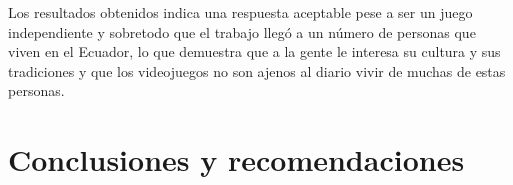 \documentclass[a4paper, openright, 12pt]{report}
\begin{document}
\justify


\justify
Los resultados obtenidos indica una respuesta aceptable pese a ser un juego independiente y sobretodo que el trabajo llegó a un número de personas que viven en el Ecuador, lo que demuestra que a la gente le interesa su cultura y sus tradiciones y que los videojuegos no son ajenos al diario vivir de muchas de estas personas.  

\chapter{Conclusiones y recomendaciones}
\end{document}
